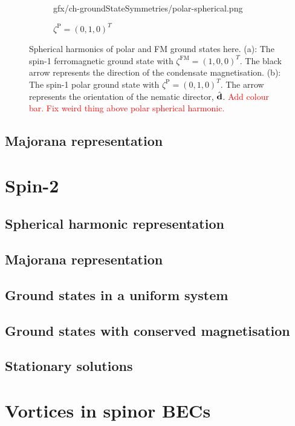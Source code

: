 \begin{figure}
\begin{subfigure}{0.49\textwidth}
        {gfx/ch-groundStateSymmetries/polar-spherical.png}
        \caption{\(\zeta^\mathrm{P}={(0, 1, 0)}^T\)}
    \end{subfigure}
    \caption{Spherical harmonics of polar and FM ground states
    here.
    (a): The spin-1 ferromagnetic ground state with
    \(\zeta^\mathrm{FM}={(1, 0, 0)}^T\).
    The black arrow represents the direction of the condensate magnetisation.
    (b): The spin-1 polar ground state with
    \(\zeta^\mathrm{P}={(0, 1, 0)}^T\).
    The arrow represents the orientation of the nematic director,
    \(\hat{\vb{d}}\).\label{fig: spin-1-spherical-harmonics}
    \textcolor{red}{Add colour bar. Fix weird thing above polar spherical
    harmonic.}}
\end{figure}

\subsection{Majorana representation}

\section{Spin-2}

\subsection{Spherical harmonic representation}

\subsection{Majorana representation}

\subsection{Ground states in a uniform system}

\subsection{Ground states with conserved magnetisation}

\subsection{Stationary solutions}

\section{Vortices in spinor BECs}

